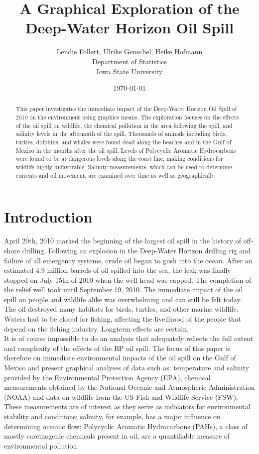\documentclass[authoryear,12pt]{elsarticle}
\title{ A Graphical Exploration of the Deep-Water Horizon Oil Spill}
\author{Lendie Follett, Ulrike Genschel, Heike Hofmann\\Department of Statistics\\Iowa State University}
\date{\today}                                           %
\begin{document}
\begin{abstract}
This paper investigates the  immediate impact of the Deep-Water Horizon Oil Spill of 2010 on the environment using graphics means. The exploration focuses on the effects of the oil spill on wildlife, the chemical pollution in the area following the spill, and salinity levels in the aftermath of the spill.
Thousands of animals including birds, turtles, dolphins, and whales were found dead along the beaches and in the Gulf of Mexico in the months after the oil spill. Levels of Polycyclic Aromatic Hydrocarbons were found to be at dangerous levels along the coast line, making conditions for wildlife highly unfavorable. Salinity measurements, which can be used to determine currents and oil movement, are examined over time as well as geographically. 
\end{abstract}

\maketitle

\section{Introduction}
April 20th, 2010 marked the beginning of the largest oil spill in the history of off-shore drilling.  Following an explosion in the Deep-Water Horizon drilling rig and failure of all emergency systems, crude oil began to gush into the ocean.  After an estimated 4.9 million barrels of oil spilled into the sea, the leak was finally stopped on July 15th of 2010 when the well head was capped.  The completion of the relief well took until September 19, 2010.  The immediate impact of the oil spill on people and wildlife alike was overwhelming and can still be felt today.  The oil destroyed many habitats for birds, turtles, and other marine wildlife.  Waters had to be closed for fishing, affecting the livelihood of the people that depend on the fishing industry. Longterm effects are certain. \\

It is of course impossible to do an analysis that adequately reflects the full extent and complexity of the effects of the BP oil spill. The focus  of this paper is therefore on immediate environmental impacts of the oil spill on the Gulf of Mexico and present graphical analyses of data such as: temperature and salinity provided by the Environmental Protection Agency (EPA), chemical measurements obtained by the National Oceanic and Atmospheric Administration (NOAA) and data on wildlife from the US Fish and Wildlife Service (FSW). These measurements are of interest as they serve as indicators for environmental stability and conditions; salinity, for example, has a major influence on determining oceanic flow;  Polycyclic Aromatic Hydrocarbons (PAHs),  a class of mostly carcinogenic chemicals present in oil, are a quantifiable measure of environmental pollution.
\end{document}
